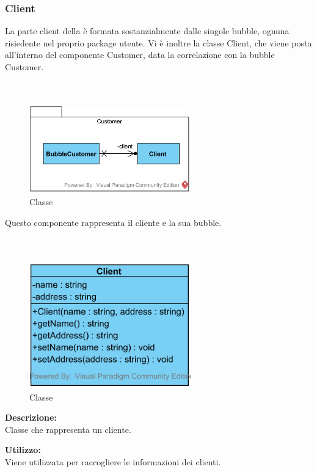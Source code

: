 \subsubsection{Client}
La parte client della \DemoName{} è formata sostanzialmente dalle singole bubble, ognuna risiedente nel proprio package utente. Vi è inoltre la classe Client, che viene posta all'interno del componente Customer, data la correlazione con la bubble Customer.
\paragraph[::Customer]{\class}\mbox{}\\ \label{\class}
\begin{figure}[H]
	\centering
	\includegraphics[width=7cm]{./diagrammi/demo/client/customer.png}
	\caption{Classe \class}
\end{figure}
Questo componente rappresenta il cliente e la sua bubble.

\subparagraph[::Client]{\class}\mbox{}\\ \label{\class}
\begin{figure}[H]
	\centering
	\includegraphics[width=7cm]{./diagrammi/demo/client/customer/client.png}
	\caption{Classe \class}
\end{figure}
\textbf{Descrizione:}\\
Classe che rappresenta un cliente.

\textbf{Utilizzo:}\\
Viene utilizzata per raccogliere le informazioni dei clienti.

